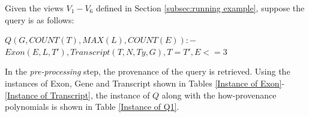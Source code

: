 \begin{example}
Given the views $V_1-V_6$ defined in Section \ref{subsec:running example}, suppose the query is as follows:
\begin{tabbing}
$Q(G, COUNT(T), MAX(L), COUNT(E)):-$\\
$Exon(E, L, T'),Transcript(T, N, Ty, G), T = T', E <= 3$
\end{tabbing}
In the {\em pre-processing} step,  the provenance of the query is retrieved. Using the instances of Exon, Gene and Transcript shown in Tables \ref{Instance of Exon}-\ref{Instance of Transcript}, the instance of $Q$ along with the how-provenance polynomials is shown in Table \ref{Instance of Q1}. 


\end{example}
